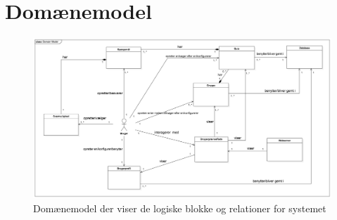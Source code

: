 \chapter{Domænemodel}
\label{appendiks:domainemodel}

\begin{figure}[h!]
  \begin{minipage}[c]{\textwidth}
    		\centering
  	\begin{turn}{90}
    		\includegraphics[width=0.77\textheight]{billeder/SystemArkitektur/DomainModelFinal}
  	\end{turn}

  \end{minipage}
  \caption{Domænemodel der viser de logiske blokke og relationer for systemet}
\end{figure}


